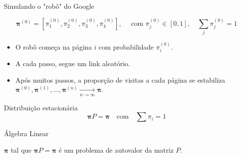 \documentclass{beamer}
\begin{document}

\begin{frame}{Simulando o "robô" do Google}

  $$ \bm{\pi}^{(0)} = \left[\pi_1^{(0)},\pi_2^{(0)},\pi_3^{(0)},\pi_4^{(0)}\right], \quad\text{ com } \pi_j^{(0)}\in[0,1],\quad\sum_j\pi_j^{(0)}=1$$
  
  \begin{itemize}
  \item O robô começa na página $i$ com probabilidade $\pi_i^{(0)}$.
  \item A cada passo, segue um link aleatório.
  \item Após muitos passos, a proporção de visitas a cada página se
    estabiliza $\bm{\pi}^{(0)}, \bm{\pi}^{(1)}, \dots, \bm{\pi}^{(n)} \xrightarrow[n\to\infty]{}  \bm{\pi}$. 
  \end{itemize}
  \begin{block}{Distribuição estacionária}
    \[ \bm\pi P = \bm\pi \quad \text{com} \quad \sum \pi_i = 1 \]
  \end{block}
\end{frame}


\begin{frame}[c]{Álgebra Linear}

  \begin{center}
    \( \bm\pi \) tal que \( \bm\pi P = \bm\pi \)   é um problema de autovalor da matriz $P$.
  \end{center}
  
\end{frame}

\end{document}
